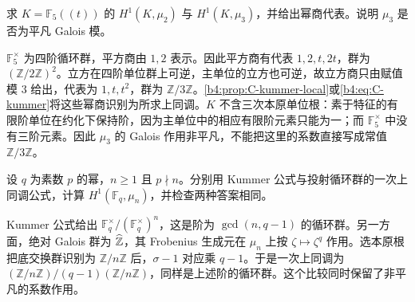 \begin{exercise}\label{b4:ex:C-local-kummer-examples}
	求 \(K=\mathbb F_5(\!(t)\!)\) 的 \(H^1(K,\mu_2)\) 与 \(H^1(K,\mu_3)\)，并给出幂商代表。说明 \(\mu_3\) 是否为平凡 Galois 模。
\end{exercise}
\begin{solution}
	\(\mathbb F_5^\times\) 为四阶循环群，平方商由 \(1,2\) 表示。因此平方商有代表 \(1,2,t,2t\)，群为 \((\mathbb Z/2\mathbb Z)^2\)。立方在四阶单位群上可逆，主单位的立方也可逆，故立方商只由赋值模 \(3\) 给出，代表为 \(1,t,t^2\)，群为 \(\mathbb Z/3\mathbb Z\)。\cref{b4:prop:C-kummer-local}或\eqref{b4:eq:C-kummer}将这些幂商识别为所求上同调。\(K\) 不含三次本原单位根：素于特征的有限阶单位在约化下保持阶，因为主单位中的相应有限阶元素只能为一；而 \(\mathbb F_5^\times\) 中没有三阶元素。因此 \(\mu_3\) 的 Galois 作用非平凡，不能把这里的系数直接写成常值 \(\mathbb Z/3\mathbb Z\)。
\end{solution}

\begin{exercise}\label{b4:ex:C-finite-field-kummer}
	设 \(q\) 为素数 \(p\) 的幂，\(n\ge1\) 且 \(p\nmid n\)。分别用 Kummer 公式与投射循环群的一次上同调公式，计算 \(H^1(\mathbb F_q,\mu_n)\)，并检查两种答案相同。
\end{exercise}
\begin{solution}
	Kummer 公式给出 \(\mathbb F_q^\times/(\mathbb F_q^\times)^n\)，这是阶为 \(\gcd(n,q-1)\) 的循环群。另一方面，绝对 Galois 群为 \(\widehat{\vphantom{Z}\mathbb Z}\)，其 Frobenius 生成元在 \(\mu_n\) 上按 \(\zeta\mapsto\zeta^q\) 作用。选本原根把底交换群识别为 \(\mathbb Z/n\mathbb Z\) 后，\(\sigma-1\) 对应乘 \(q-1\)。于是一次上同调为 \((\mathbb Z/n\mathbb Z)/(q-1)(\mathbb Z/n\mathbb Z)\)，同样是上述阶的循环群。这个比较同时保留了非平凡的系数作用。
\end{solution}

